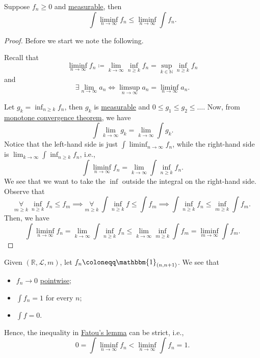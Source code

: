\begin{theorem}\label{thm:Fatou-lemma}
	Suppose \(f_{n}\geq 0\) and \hyperref[def:measurable-function]{measurable}, then
	\[
		\int \liminf_{n \to \infty} f_{n}\leq \liminf_{n \to \infty} \int f_{n}.
	\]
\end{theorem}
\begin{proof}
	Before we start we note the following.
	\begin{remark}
		Recall that
		\[
			\liminf_{n \to \infty} f_{n} \coloneqq \lim_{k \to \infty} \inf_{n\geq k}f_{n} = \sup _{k\in\mathbb{N} }\inf _{n\geq k}f_{n}
		\]
		and
		\[
			\exists\lim_{n \to \infty} a_{n}\iff \limsup_{n \to \infty} a_{n} = \liminf_{n \to \infty} a_{n}.
		\]
	\end{remark}
	Let \(g_{k} = \inf _{n\geq k}f_{n}\), then \(g_{k}\) is \hyperref[def:measurable-function]{measurable} and \(0\leq g_1 \leq g_2 \leq \dots  \). Now, from \hyperref[thm:MCT]{monotone convergence theorem}, we have
	\[
		\int \lim_{k \to \infty}  g_{k} = \lim_{k \to \infty} \int g_{k}.
	\]
	Notice that the left-hand side is just \(\int \liminf_{n \to \infty} f_{n}\), while the right-hand side is \(\lim_{k \to \infty} \int \inf _{n\geq k}f_{n}\),
	i.e.,
	\[
		\int \liminf_{n \to \infty} f_{n} = \lim_{k \to \infty} \int \inf _{n\geq k}f_{n}.
	\]
	We see that we want to take the \(\inf\) outside the integral on the right-hand side. Observe that
	\[
		\underset{m\geq k}{\forall }\ \inf _{n\geq k}f_{n}\leq f _{m} \implies \underset{m\geq k}{\forall }\ \int \inf _{n\geq k}f\leq \int f _{m}\implies \int \inf _{n\geq k}f_{n}\leq \inf_{m\geq k}\int f _{m}.
	\]
	Then, we have
	\[
		\int \liminf_{n \to \infty} f_{n} = \lim_{k \to \infty} \int \inf _{n\geq k}f_{n}\leq \lim_{k \to \infty} \inf _{m\geq k}\int f _{m} = \liminf_{m \to \infty} \int f _{m}.
	\]
\end{proof}

\begin{eg}
	Given \((\mathbb{R} , \mathcal{L} , m)\), let \(f_{n}\coloneqq \mathbbm{1}_{(n, n+1)} \). We see that
	\begin{itemize}
		\item \(f_{n}\to 0\) \hyperref[def:pointwise-convergence]{pointwise};
		\item \(\int f_{n} = 1\) for every \(n\);
		\item \(\int f = 0\).
	\end{itemize}
	Hence, the inequality in \hyperref[thm:Fatou-lemma]{Fatou's lemma} can be strict, i.e.,
	\[
		0 = \int \liminf_{n \to \infty} f_{n} < \liminf_{n \to \infty} \int f_{n} = 1.
	\]
\end{eg}

